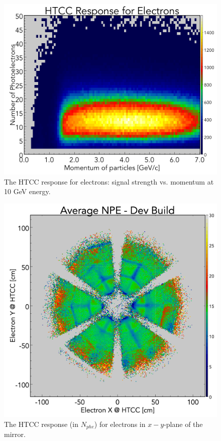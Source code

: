 \begin{figure}[!ht]
    \centering
    \includegraphics[width=1.0\linewidth,trim={0.0cm 0.0cm 0.0cm 1.73cm},clip]{images/HTCC_Response_run4013.png}
    \caption{The HTCC response for electrons: signal strength vs. momentum at 10 GeV energy.}
    \label{fig:HTCC_Response_run4013}
\end{figure}

\begin{figure}[!ht]
    \centering
    \includegraphics[width=1.0\linewidth,trim={0.0cm 0.0cm 0.0cm 1.67cm},clip]{images/avgNPE_Theta_Phi_Dev_Build-2_NO_HOLES.png}
    \caption{The HTCC response (in $N_{phe}$) for electrons in $x-y$-plane of the mirror.}
    \label{fig:avgNPE_Theta_Phi_Dev_Build-2_NO_HOLES}
\end{figure}

